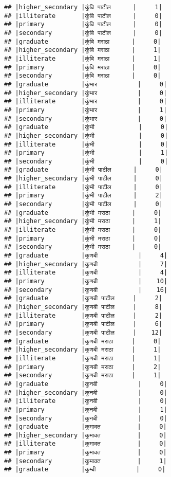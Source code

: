 \documentclass[
]{article}
\begin{document}
\begin{verbatim}
## |higher_secondary |कुंबि पाटील      |     1|
## |illiterate       |कुंबि पाटील      |     0|
## |primary          |कुंबि पाटील      |     0|
## |secondary        |कुंबि पाटील      |     0|
## |graduate         |कुंबि मराठा      |     0|
## |higher_secondary |कुंबि मराठा      |     1|
## |illiterate       |कुंबि मराठा      |     1|
## |primary          |कुंबि मराठा      |     0|
## |secondary        |कुंबि मराठा      |     0|
## |graduate         |कुंभार           |     0|
## |higher_secondary |कुंभार           |     0|
## |illiterate       |कुंभार           |     0|
## |primary          |कुंभार           |     1|
## |secondary        |कुंभार           |     0|
## |graduate         |कुंभी            |     0|
## |higher_secondary |कुंभी            |     0|
## |illiterate       |कुंभी            |     0|
## |primary          |कुंभी            |     1|
## |secondary        |कुंभी            |     0|
## |graduate         |कुंभी पाटील      |     0|
## |higher_secondary |कुंभी पाटील      |     0|
## |illiterate       |कुंभी पाटील      |     0|
## |primary          |कुंभी पाटील      |     2|
## |secondary        |कुंभी पाटील      |     0|
## |graduate         |कुंभी मराठा      |     0|
## |higher_secondary |कुंभी मराठा      |     1|
## |illiterate       |कुंभी मराठा      |     0|
## |primary          |कुंभी मराठा      |     0|
## |secondary        |कुंभी मराठा      |     0|
## |graduate         |कुणबी           |     4|
## |higher_secondary |कुणबी           |     7|
## |illiterate       |कुणबी           |     4|
## |primary          |कुणबी           |    10|
## |secondary        |कुणबी           |    16|
## |graduate         |कुणबी पाटील     |     2|
## |higher_secondary |कुणबी पाटील     |     8|
## |illiterate       |कुणबी पाटील     |     2|
## |primary          |कुणबी पाटील     |     6|
## |secondary        |कुणबी पाटील     |    12|
## |graduate         |कुणबी मराठा     |     0|
## |higher_secondary |कुणबी मराठा     |     1|
## |illiterate       |कुणबी मराठा     |     1|
## |primary          |कुणबी मराठा     |     2|
## |secondary        |कुणबी मराठा     |     1|
## |graduate         |कुनबी           |     0|
## |higher_secondary |कुनबी           |     0|
## |illiterate       |कुनबी           |     0|
## |primary          |कुनबी           |     1|
## |secondary        |कुनबी           |     0|
## |graduate         |कुमावत          |     0|
## |higher_secondary |कुमावत          |     0|
## |illiterate       |कुमावत          |     0|
## |primary          |कुमावत          |     0|
## |secondary        |कुमावत          |     1|
## |graduate         |कुम्बी           |     0|

\end{verbatim}
\end{document}
